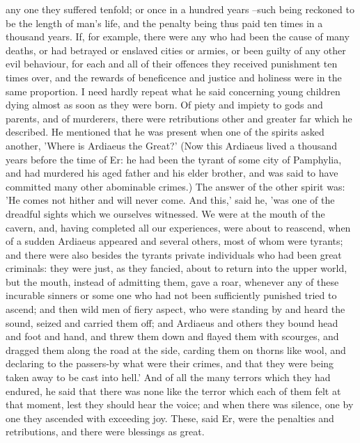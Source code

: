any one they suffered tenfold; or once in a hundred years --such being reckoned to be the length of man's life, and the penalty being thus paid ten times in a thousand years. If, for example, there were any who had been the cause of many deaths, or had betrayed or enslaved cities or armies, or been guilty of any other evil behaviour, for each and all of their offences they received punishment ten times over, and the rewards of beneficence and justice and holiness were in the same proportion. I need hardly repeat what he said concerning young children dying almost as soon as they were born. Of piety and impiety to gods and parents, and of murderers, there were retributions other and greater far which he described. He mentioned that he was present when one of the spirits asked another, 'Where is Ardiaeus the Great?' (Now this Ardiaeus lived a thousand years before the time of Er: he had been the tyrant of some city of Pamphylia, and had murdered his aged father and his elder brother, and was said to have committed many other abominable crimes.) The answer of the other spirit was: 'He comes not hither and will never come. And this,' said he, 'was one of the dreadful sights which we ourselves witnessed. We were at the mouth of the cavern, and, having completed all our experiences, were about to reascend, when of a sudden Ardiaeus appeared and several others, most of whom were tyrants; and there were also besides the tyrants private individuals who had been great criminals: they were just, as they fancied, about to return into the upper world, but the mouth, instead of admitting them, gave a roar, whenever any of these incurable sinners or some one who had not been sufficiently punished tried to ascend; and then wild men of fiery aspect, who were standing by and heard the sound, seized and carried them off; and Ardiaeus and others they bound head and foot and hand, and threw them down and flayed them with scourges, and dragged them along the road at the side, carding them on thorns like wool, and declaring to the passers-by what were their crimes, and that they were being taken away to be cast into hell.' And of all the many terrors which they had endured, he said that there was none like the terror which each of them felt at that moment, lest they should hear the voice; and when there was silence, one by one they ascended with exceeding joy. These, said Er, were the penalties and retributions, and there were blessings as great.


